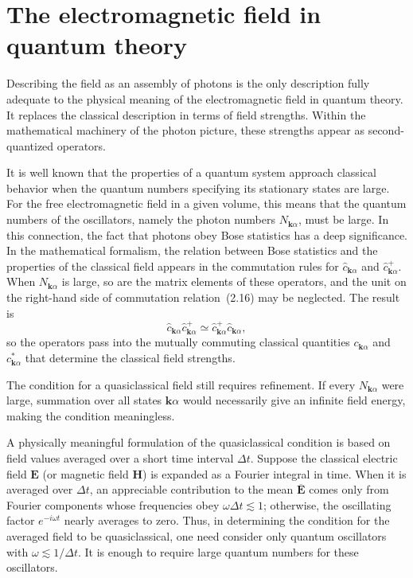 \section{The electromagnetic field in quantum theory}

Describing the field as an assembly of photons is the only description fully adequate to the physical meaning of the electromagnetic field in quantum theory. It replaces the classical description in terms of field strengths. Within the mathematical machinery of the photon picture, these strengths appear as second-quantized operators.

It is well known that the properties of a quantum system approach classical behavior when the quantum numbers specifying its stationary states are large. For the free electromagnetic field in a given volume, this means that the quantum numbers of the oscillators, namely the photon numbers $N_{\mathbf{k}\alpha}$, must be large. In this connection, the fact that photons obey Bose statistics has a deep significance. In the mathematical formalism, the relation between Bose statistics and the properties of the classical field appears in the commutation rules for $\widehat c_{\mathbf{k}\alpha}$ and $\widehat c^+_{\mathbf{k}\alpha}$. When $N_{\mathbf{k}\alpha}$ is large, so are the matrix elements of these operators, and the unit on the right-hand side of commutation relation~(2.16) may be neglected. The result is
\[
\widehat c_{\mathbf{k}\alpha}\widehat c^+_{\mathbf{k}\alpha} \simeq
\widehat c^+_{\mathbf{k}\alpha}\widehat c_{\mathbf{k}\alpha},
\]
so the operators pass into the mutually commuting classical quantities $c_{\mathbf{k}\alpha}$ and $c^*_{\mathbf{k}\alpha}$ that determine the classical field strengths.

The condition for a quasiclassical field still requires refinement. If every $N_{\mathbf{k}\alpha}$ were large, summation over all states $\mathbf{k}\alpha$ would necessarily give an infinite field energy, making the condition meaningless.

A physically meaningful formulation of the quasiclassical condition is based on field values averaged over a short time interval $\Delta t$. Suppose the classical electric field $\mathbf E$ (or magnetic field $\mathbf H$) is expanded as a Fourier integral in time. When it is averaged over $\Delta t$, an appreciable contribution to the mean $\overline{\mathbf E}$ comes only from Fourier components whose frequencies obey $\omega\Delta t \lesssim 1$; otherwise, the oscillating factor $e^{-i\omega t}$ nearly averages to zero. Thus, in determining the condition for the averaged field to be quasiclassical, one need consider only quantum oscillators with $\omega \lesssim 1/\Delta t$. It is enough to require large quantum numbers for these oscillators.

